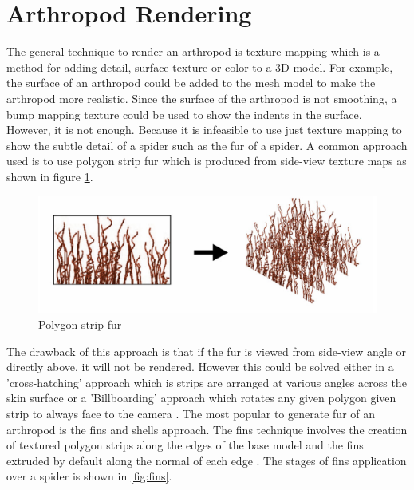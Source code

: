 \section{Arthropod Rendering}
The general technique to render an arthropod is texture mapping
which is a method for adding detail, surface texture or color to a 3D
model. For example, the surface of an arthropod could be added to the
mesh model to make the arthropod more realistic. Since the surface of the
arthropod is not smoothing, a bump mapping texture could be used to
show the indents in the surface. 
However, it is not enough. Because it is infeasible to use just
texture mapping to show the subtle detail of a
spider such as the fur of a spider. 
A common approach used is to use polygon strip fur which is produced
from side-view texture maps \cite{fur} as shown in figure \ref{fig:fur}.
\begin{figure}[ht!]
\includegraphics[height=5 cm]{figures/fur.png}
\caption{Polygon strip fur \protect\cite{fur}}
\label{fig:fur}
\end{figure}
The drawback of this approach is that if the fur is viewed from
side-view angle or directly above, it will not be rendered. However
this could be solved either in a 'cross-hatching' approach which is
strips are arranged at various angles across the skin surface or a
'Billboarding' approach which rotates any given polygon given strip to
always face to the camera \cite{fur}.
The most popular to generate fur
of an arthropod is the fins and shells approach. The fins technique 
involves the creation of textured polygon strips along the edges of
the base model and the fins extruded by default along the normal of
each edge \cite{thesis}.  The stages of fins application over a spider
is shown in \ref{fig:fins}.
